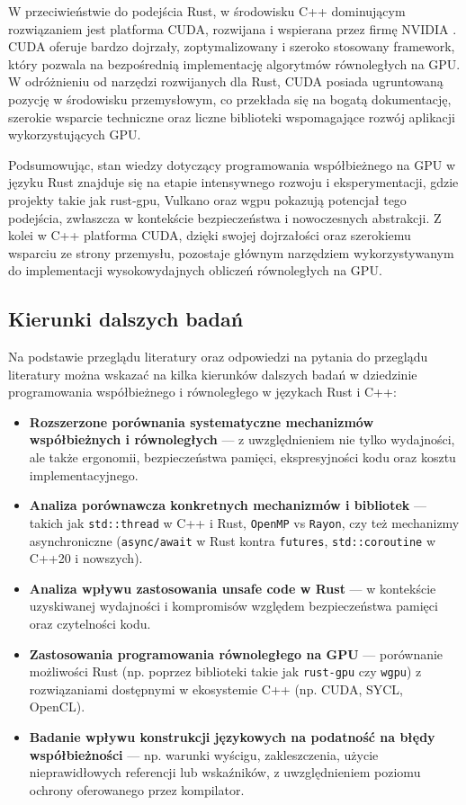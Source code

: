 W przeciwieństwie do podejścia Rust, w środowisku C++ dominującym rozwiązaniem jest platforma CUDA, rozwijana i wspierana przez firmę NVIDIA \cite{nvidiaCUDAToolkit}. CUDA oferuje bardzo dojrzały, zoptymalizowany i szeroko stosowany framework, który pozwala na bezpośrednią implementację algorytmów równoległych na GPU. W odróżnieniu od narzędzi rozwijanych dla Rust, CUDA posiada ugruntowaną pozycję w środowisku przemysłowym, co przekłada się na bogatą dokumentację, szerokie wsparcie techniczne oraz liczne biblioteki wspomagające rozwój aplikacji wykorzystujących GPU.

Podsumowując, stan wiedzy dotyczący programowania współbieżnego na GPU w języku Rust znajduje się na etapie intensywnego rozwoju i eksperymentacji, gdzie projekty takie jak rust‑gpu, Vulkano oraz wgpu \cite{wgpuWgpuPortable} pokazują potencjał tego podejścia, zwłaszcza w kontekście bezpieczeństwa i nowoczesnych abstrakcji. Z kolei w C++ platforma CUDA, dzięki swojej dojrzałości oraz szerokiemu wsparciu ze strony przemysłu, pozostaje głównym narzędziem wykorzystywanym do implementacji wysokowydajnych obliczeń równoległych na GPU.

\subsection{Kierunki dalszych badań}
Na podstawie przeglądu literatury oraz odpowiedzi na pytania do przeglądu literatury można wskazać na kilka kierunków dalszych badań w dziedzinie programowania współbieżnego i równoległego w językach Rust i C++:
\begin{itemize}
    \item \textbf{Rozszerzone porównania systematyczne mechanizmów współbieżnych i równoległych} — z uwzględnieniem nie tylko wydajności, ale także ergonomii, bezpieczeństwa pamięci, ekspresyjności kodu oraz kosztu implementacyjnego.
    \item \textbf{Analiza porównawcza konkretnych mechanizmów i bibliotek} — takich jak \texttt{std::thread} w C++ i Rust, \texttt{OpenMP} vs \texttt{Rayon}, czy też mechanizmy asynchroniczne (\texttt{async/await} w Rust kontra \texttt{futures}, \texttt{std::coroutine} w C++20 i nowszych).
    \item \textbf{Analiza wpływu zastosowania unsafe code w Rust} — w kontekście uzyskiwanej wydajności i kompromisów względem bezpieczeństwa pamięci oraz czytelności kodu.
    \item \textbf{Zastosowania programowania równoległego na GPU} — porównanie możliwości Rust (np. poprzez biblioteki takie jak \texttt{rust-gpu} czy \texttt{wgpu}) z rozwiązaniami dostępnymi w ekosystemie C++ (np. CUDA, SYCL, OpenCL).
    \item \textbf{Badanie wpływu konstrukcji językowych na podatność na błędy współbieżności} — np. warunki wyścigu, zakleszczenia, użycie nieprawidłowych referencji lub wskaźników, z uwzględnieniem poziomu ochrony oferowanego przez kompilator.
\end{itemize}
